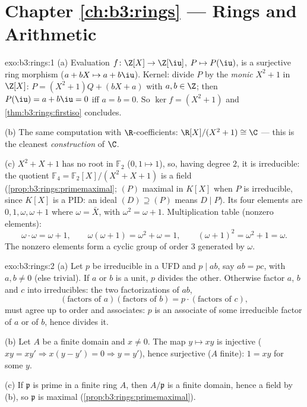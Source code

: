 \section*{Chapter \ref{ch:b3:rings} --- Rings and Arithmetic}

\begin{solution}{exo:b3:rings:1}
(a) Evaluation $f \colon \Z[X] \to \Z[\iu]$, $P \mapsto P(\iu)$,
is a surjective ring morphism ($a + bX \mapsto a + b\iu$). Kernel:
divide $P$ by the \emph{monic} $X^2 + 1$ in $\Z[X]$: $P = (X^2 +
1)Q + (bX + a)$ with $a, b \in \Z$; then $P(\iu) = a + b\iu = 0$
iff $a = b = 0$. So $\ker f = (X^2+1)$ and
\cref{thm:b3:rings:firstiso} concludes.

(b) The same computation with $\R$-coefficients: $\R[X]/(X^2+1)
\cong \C$ --- this is the cleanest \emph{construction} of $\C$.

(c) $X^2 + X + 1$ has no root in $\mathbb F_2$ ($0, 1 \mapsto 1$),
so, having degree $2$, it is irreducible: the quotient $\mathbb
F_4 = \mathbb F_2[X]/(X^2+X+1)$ is a field
(\cref{prop:b3:rings:primemaximal}; $(P)$ maximal in $K[X]$ when
$P$ is irreducible, since $K[X]$ is a PID: an ideal $(D) \supseteq
(P)$ means $D \mid P$). Its four elements are $0, 1, \omega,
\omega + 1$ where $\omega = \bar X$, with $\omega^2 = \omega + 1$.
Multiplication table (nonzero elements):
\[
\omega \cdot \omega = \omega + 1, \qquad
\omega(\omega + 1) = \omega^2 + \omega = 1, \qquad
(\omega+1)^2 = \omega^2 + 1 = \omega .
\]
The nonzero elements form a cyclic group of order $3$ generated by
$\omega$.
\end{solution}

\begin{solution}{exo:b3:rings:2}
(a) Let $p$ be irreducible in a UFD and $p \mid ab$, say $ab =
pc$, with $a, b \neq 0$ (else trivial). If $a$ or $b$ is a unit,
$p$ divides the other. Otherwise factor $a$, $b$ and $c$ into
irreducibles: the two factorizations of $ab$,
\[
(\text{factors of } a)(\text{factors of } b) = p \cdot
(\text{factors of } c),
\]
must agree up to order and associates: $p$ is an associate of some
irreducible factor of $a$ or of $b$, hence divides it.

(b) Let $A$ be a finite domain and $x \neq 0$. The map $y \mapsto
xy$ is injective ($xy = xy' \Rightarrow x(y - y') = 0 \Rightarrow
y = y'$), hence surjective ($A$ finite): $1 = xy$ for some $y$.

(c) If $\mathfrak p$ is prime in a finite ring $A$, then
$A/\mathfrak p$ is a finite domain, hence a field by (b), so
$\mathfrak p$ is maximal (\cref{prop:b3:rings:primemaximal}).
\end{solution}

